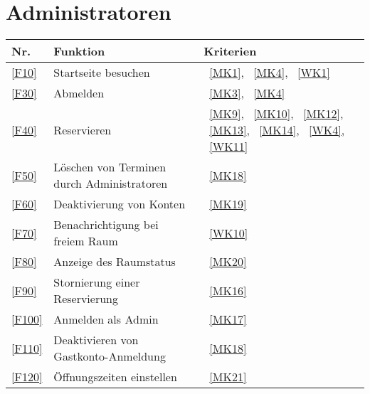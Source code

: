 \section{Administratoren}\label{sec:adminfunktionen}

\begin{table}[htbp]
    \centering
    \begin{tabularx}{\textwidth}{ l|X|>{\raggedright\arraybackslash}X  }
        \textbf{Nr.} & \textbf{Funktion} & \textbf{Kriterien} \\ \hline\hline
        \ref{F10} & Startseite besuchen &~\ref{MK1}, ~\ref{MK4}, ~\ref{WK1} \\
        \ref{F30} & Abmelden &~\ref{MK3}, ~\ref{MK4} \\
        \ref{F40} & Reservieren &~\ref{MK9}, ~\ref{MK10}, ~\ref{MK12}, ~\ref{MK13}, ~\ref{MK14}, ~\ref{WK4}, ~\ref{WK11} \\
        \ref{F50} & Löschen von Terminen durch Administratoren &~\ref{MK18} \\
        \ref{F60} & Deaktivierung von Konten &~\ref{MK19} \\
        \ref{F70} & Benachrichtigung bei freiem Raum &~\ref{WK10} \\
        \ref{F80} & Anzeige des Raumstatus &~\ref{MK20} \\
        \ref{F90} & Stornierung einer Reservierung &~\ref{MK16} \\
        \ref{F100} & Anmelden als Admin &~\ref{MK17} \\
        \ref{F110} & Deaktivieren von Gastkonto-Anmeldung &~\ref{MK18} \\
        \ref{F120} & Öffnungszeiten einstellen &~\ref{MK21} \\
    \end{tabularx}
    \label{tab:adminfunctions}
\end{table}



